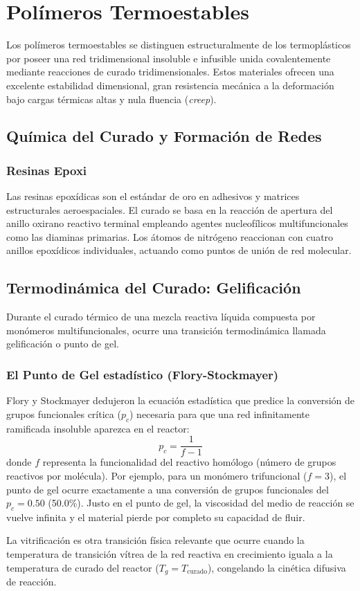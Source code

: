 \chapter{Polímeros Termoestables}
\label{cap:termoestables}

Los polímeros termoestables se distinguen estructuralmente de los termoplásticos por poseer una red tridimensional insoluble e infusible unida covalentemente mediante reacciones de curado tridimensionales. Estos materiales ofrecen una excelente estabilidad dimensional, gran resistencia mecánica a la deformación bajo cargas térmicas altas y nula fluencia (\textit{creep}).

\section{Química del Curado y Formación de Redes}

\subsection{Resinas Epoxi}
Las resinas epoxídicas son el estándar de oro en adhesivos y matrices estructurales aeroespaciales. El curado se basa en la reacción de apertura del anillo oxirano reactivo terminal empleando agentes nucleofílicos multifuncionales como las diaminas primarias. Los átomos de nitrógeno reaccionan con cuatro anillos epoxídicos individuales, actuando como puntos de unión de red molecular.

\section{Termodinámica del Curado: Gelificación}

Durante el curado térmico de una mezcla reactiva líquida compuesta por monómeros multifuncionales, ocurre una transición termodinámica llamada gelificación o punto de gel. 

\subsection{El Punto de Gel estadístico (Flory-Stockmayer)}
Flory y Stockmayer dedujeron la ecuación estadística que predice la conversión de grupos funcionales crítica ($p_c$) necesaria para que una red infinitamente ramificada insoluble aparezca en el reactor:
\begin{equation}
    p_c = \frac{1}{f - 1}
    \label{eq:punto_gel}
\end{equation}
donde $f$ representa la funcionalidad del reactivo homólogo (número de grupos reactivos por molécula). Por ejemplo, para un monómero trifuncional ($f = 3$), el punto de gel ocurre exactamente a una conversión de grupos funcionales del $p_c = 0.50$ (50.0\%). Justo en el punto de gel, la viscosidad del medio de reacción se vuelve infinita y el material pierde por completo su capacidad de fluir.

La vitrificación es otra transición física relevante que ocurre cuando la temperatura de transición vítrea de la red reactiva en crecimiento iguala a la temperatura de curado del reactor ($T_g = T_{\text{curado}}$), congelando la cinética difusiva de reacción.
